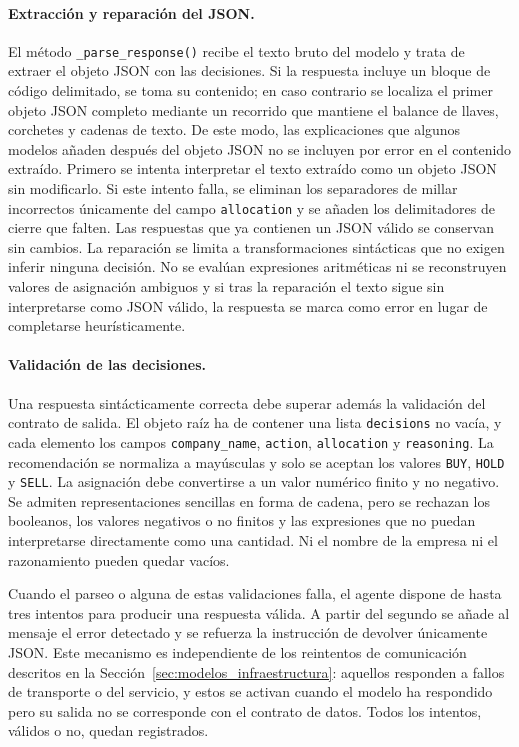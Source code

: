\paragraph{Extracción y reparación del JSON.}
El método \texttt{\_parse\_response()} recibe el texto bruto del modelo y trata de extraer el objeto JSON con las decisiones. Si la respuesta incluye un bloque de código delimitado, se toma su contenido; en caso contrario se localiza el primer objeto JSON completo mediante un recorrido que mantiene el balance de llaves, corchetes y cadenas de texto. De este modo, las explicaciones que algunos modelos añaden después del objeto JSON no se incluyen por error en el contenido extraído. Primero se intenta interpretar el texto extraído como un objeto JSON sin modificarlo. Si este intento falla, se eliminan los separadores de millar incorrectos únicamente del campo \texttt{allocation} y se añaden los delimitadores de cierre que falten. Las respuestas que ya contienen un JSON válido se conservan sin cambios. La reparación se limita a transformaciones sintácticas que no exigen inferir ninguna decisión. No se evalúan expresiones aritméticas ni se reconstruyen valores de asignación ambiguos y si tras la reparación el texto sigue sin interpretarse como JSON válido, la respuesta se marca como error en lugar de completarse heurísticamente.

\paragraph{Validación de las decisiones.}
Una respuesta sintácticamente correcta debe superar además la validación del contrato de salida. El objeto raíz ha de contener una lista \texttt{decisions} no vacía, y cada elemento los campos \texttt{company\_name}, \texttt{action}, \texttt{allocation} y \texttt{reasoning}. La recomendación se normaliza a mayúsculas y solo se aceptan los valores \texttt{BUY}, \texttt{HOLD} y \texttt{SELL}. La asignación debe convertirse a un valor numérico finito y no negativo. Se admiten representaciones sencillas en forma de cadena, pero se rechazan los booleanos, los valores negativos o no finitos y las expresiones que no puedan interpretarse directamente como una cantidad. Ni el nombre de la empresa ni el razonamiento pueden quedar vacíos.

Cuando el parseo o alguna de estas validaciones falla, el agente dispone de hasta tres intentos para producir una respuesta válida. A partir del segundo se añade al mensaje el error detectado y se refuerza la instrucción de devolver únicamente JSON. Este mecanismo es independiente de los reintentos de comunicación descritos en la Sección~\ref{sec:modelos_infraestructura}: aquellos responden a fallos de transporte o del servicio, y estos se activan cuando el modelo ha respondido pero su salida no se corresponde con el contrato de datos. Todos los intentos, válidos o no, quedan registrados.

